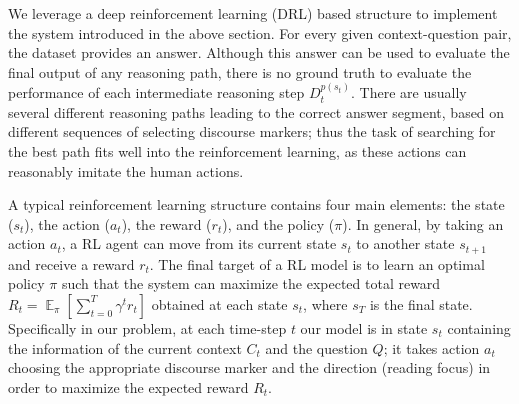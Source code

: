 We leverage a deep reinforcement learning (DRL) based structure to implement the system introduced in the above section. 
For every given context-question pair, the dataset provides an answer. Although this answer can be used to evaluate the final output of any reasoning path, there is no ground truth to evaluate the performance of each intermediate reasoning step $D^{p(s_t)}_t$. There are usually several different reasoning paths leading to the correct answer segment, based on different sequences of selecting discourse markers; thus the  task of searching for the best path fits well into the reinforcement learning, as these actions can reasonably imitate the human actions.


A typical reinforcement learning structure contains four main elements: the state ($s_t$), the action ($a_t$), the reward ($r_t$), and the policy ($\pi$). In general, by taking an action $a_t$, a RL agent can move from its current state $s_t$ to another state $s_{t+1}$ and receive a reward $r_t$. The final target of a RL model is to learn an optimal policy $\pi$ such that the system can maximize the expected total reward $R_t=\mathop{\mathbb{E}}_\pi[\sum_{t=0}^{T}\gamma^t r_t]$ obtained at each state $s_t$, where $s_T$ is the final state. Specifically in our problem, at each time-step $t$ our model is in state $s_t$ containing the information of the current context $C_t$ and the question $Q$; it takes action $a_t$ choosing the appropriate discourse marker and the direction (reading focus) in order
to maximize the expected reward $R_t$. 

